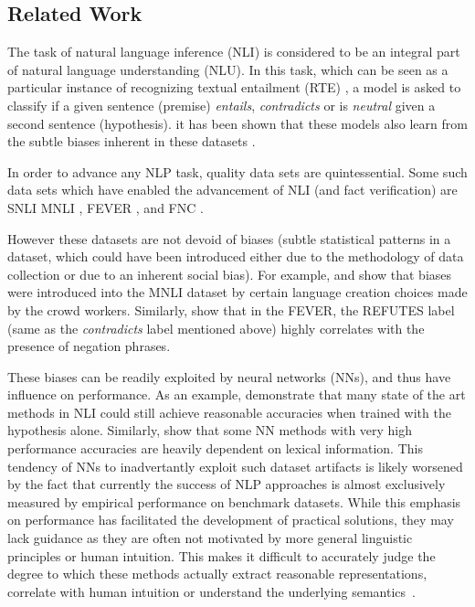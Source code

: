 \documentclass[compsoc,onecolumn]{IEEEtran}
\begin{document}
\subsection{Related Work}
The task of natural language inference (NLI) is considered to be an integral part of natural language understanding (NLU). In this task, which can be seen as a particular instance of recognizing textual entailment (RTE) \cite{fyodorov2000natural,condoravdi2003entailment,bos2005recognising,maccartney2009extended}, a model is asked to classify if a given sentence (premise) \textit{entails}, \textit{contradicts} or is \textit{neutral} given a second sentence (hypothesis).
it has been shown that these models also learn from the subtle biases inherent in these datasets \cite{gururangan2018annotation}.

In order to advance any NLP task, quality data sets are quintessential. Some such data sets which have enabled the advancement of NLI (and fact verification) are SNLI \cite{bowman2015large} MNLI \cite{williams2017broad}, FEVER \cite{thorne2018fever}, and FNC \cite{pomerleau2017fake}.

However these datasets are not devoid of biases (subtle statistical patterns in a dataset, which could have been introduced either due to the methodology of data collection or due to an inherent social bias). 
For example, \cite{gururangan2018annotation} and \cite{poliak2018hypothesis} show that biases were introduced into the MNLI dataset by certain language creation choices made by the crowd workers. Similarly, \cite{schuster2019towards} show that in the FEVER, the REFUTES label (same as the \textit{contradicts} label mentioned above) highly correlates with the presence of negation phrases. 

These biases can be readily exploited by neural networks (NNs), and thus have influence on performance.  As an example, \cite{gururangan2018annotation} demonstrate that many state of the art methods in NLI could still achieve reasonable accuracies when trained with the hypothesis alone. Similarly, \cite{emnlp2019sandeep} show that some NN methods with very high performance accuracies are heavily dependent on lexical information. This tendency of NNs to inadvertantly exploit such dataset artifacts is likely worsened by the fact that currently the success of NLP approaches is almost exclusively measured by empirical performance on benchmark datasets. While this emphasis on performance has facilitated the development of practical solutions, they may lack guidance as they are often not motivated by more general linguistic principles or human intuition. This makes it difficult to accurately judge the degree to which these methods actually extract reasonable representations, correlate with  human intuition or understand the underlying semantics~\cite{dagan2013recognizing}.
\end{document}

